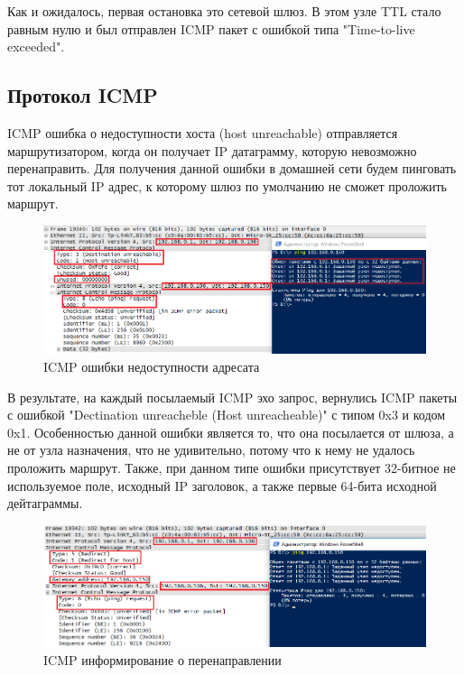 \documentclass[14pt,a4paper,report]{report}
\begin{document}
Как и ожидалось, первая остановка это сетевой шлюз. В этом узле TTL стало равным нулю и был отправлен ICMP пакет с ошибкой типа "Time-to-live exceeded".

\clearpage

\subsection{Протокол ICMP}

ICMP ошибка о недоступности хоста (host unreachable) отправляется маршрутизатором, когда он получает IP датаграмму, которую невозможно перенаправить. Для получения данной ошибки в домашней сети будем пинговать тот локальный IP адрес, к которому шлюз по умолчанию не сможет проложить маршрут. 

\begin{figure}[h!]
	\centering
	\includegraphics[scale = 0.69]{images/icmp1.png}
	
	\caption{ICMP ошибки недоступности адресата}
	\label{image:8}
\end{figure}

В результате, на каждый посылаемый ICMP эхо запрос, вернулись ICMP пакеты с ошибкой "Dectination unreacheble (Host unreacheable)" с типом 0x3 и кодом 0x1. Особенностью данной ошибки является то, что она посылается от шлюза, а не от узла назначения, что не удивительно, потому что к нему не удалось проложить маршрут. Также, при данном типе ошибки присутствует 32-битное не используемое поле, исходный IP заголовок, а также первые 64-бита исходной дейтаграммы.

\begin{figure}[h!]
	\centering
	\includegraphics[scale = 0.69]{images/icmp2.png}
	
	\caption{ICMP информирование о перенаправлении}
	\label{image:9}
\end{figure}
\end{document}
